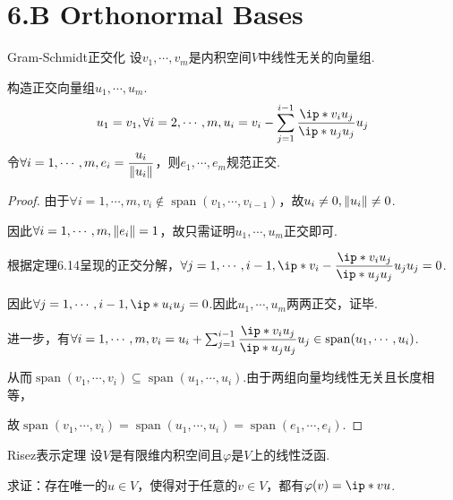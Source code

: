 \section{6.B Orthonormal Bases}

\begin{theorem}[6.31]\label{thm 6.31} Gram-Schmidt正交化 \: 
    设\(v_1,\cdots,v_m\)是内积空间\(V\)中线性无关的向量组.
    
    构造正交向量组\(u_1,\cdots,u_m\).
    \begin{align*}
        u_1=v_1,\forall i=2,\cdots,m,u_i=v_i-\sum_{j=1}^{i-1} \dfrac{\ip*{v_i}{u_j}}{\ip*{u_j}{u_j}}u_j
    \end{align*}
    令\(\forall i=1,\cdots,m,e_i=\dfrac{u_i}{\norm*{u_i}}\)，则\(e_1,\cdots,e_m\)规范正交.
\end{theorem}

\begin{proof}
    由于\(\forall i=1,\cdots,m,v_i \notin \operatorname{span}(v_1,\cdots,v_{i-1})\)，故\(u_i \ne 0,\norm*{u_i} \ne 0\).

    因此\(\forall i=1,\cdots,m,\norm*{e_i}=1\)，故只需证明\(u_1,\cdots,u_m\)正交即可.
    
    根据定理6.14呈现的正交分解，\(\forall j=1,\cdots,i-1,\ip*{v_i-\dfrac{\ip*{v_i}{u_j}}{\ip*{u_j}{u_j}}u_j}{u_j}=0\).
    
    因此\(\forall j=1,\cdots,i-1,\ip*{u_i}{u_j}=0\).因此\(u_1,\cdots,u_m\)两两正交，证毕.
    
    进一步，有\(\forall i=1,\cdots,m,v_i=u_i+\sum_{j=1}^{i-1} \dfrac{\ip*{v_i}{u_j}}{\ip*{u_j}{u_j}}u_j \in \operatorname{span}(u_1,\cdots,u_i)\).
    
    从而\(\operatorname{span}(v_1,\cdots,v_i) \subseteq \operatorname{span}(u_1,\cdots,u_i)\).由于两组向量均线性无关且长度相等，
    
    故\(\operatorname{span}(v_1,\cdots,v_i)=\operatorname{span}(u_1,\cdots,u_i)=\operatorname{span}(e_1,\cdots,e_i)\).
\end{proof}

\begin{theorem}[6.42]\label{thm 6.42} Risez表示定理 \:
    设\(V\)是有限维内积空间且\(\varphi\)是\(V\)上的线性泛函.

    求证：存在唯一的\(u \in V\)，使得对于任意的\(v \in V\)，都有\(\varphi(v)=\ip*{v}{u}\).
\end{theorem}

